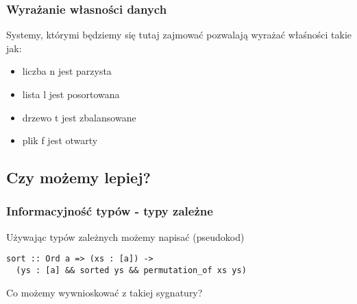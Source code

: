 \documentclass{beamer}
\begin{document}


\begin{frame}[fragile]
\frametitle{Wyrażanie własności danych}

Systemy, którymi będziemy się tutaj zajmować pozwalają
wyrażać właśności takie jak: 

\begin{itemize}
\item liczba n jest parzysta
\item lista l jest posortowana
\item drzewo t jest zbalansowane
\item plik f jest otwarty
\end{itemize}

\end{frame}


\subsection{Czy możemy lepiej?}

\begin{frame}[fragile]
\frametitle{Informacyjność typów - typy zależne}

Używając typów zależnych możemy napisać (pseudokod)

\begin{lstlisting}
sort :: Ord a => (xs : [a]) -> 
  (ys : [a] && sorted ys && permutation_of xs ys)
\end{lstlisting}


Co możemy wywnioskować z takiej sygnatury?


\end{frame}

\end{document}
